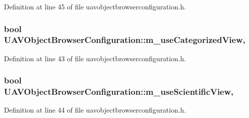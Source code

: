 Definition at line 45 of file uavobjectbrowserconfiguration.\-h.

\hypertarget{group___u_a_v_object_browser_plugin_ga5e0ce819c5383cf9b01ec73c887f67f8}{
\subsubsection[{m\-\_\-use\-Categorized\-View}]{\setlength{\rightskip}{0pt plus 5cm}bool U\-A\-V\-Object\-Browser\-Configuration\-::m\-\_\-use\-Categorized\-View\hspace{0.3cm}{\ttfamily [read]}, {\ttfamily [write]}}}\label{group___u_a_v_object_browser_plugin_ga5e0ce819c5383cf9b01ec73c887f67f8}


Definition at line 43 of file uavobjectbrowserconfiguration.\-h.

\hypertarget{group___u_a_v_object_browser_plugin_ga45e17799029628f880291ec2324473a5}{
\subsubsection[{m\-\_\-use\-Scientific\-View}]{\setlength{\rightskip}{0pt plus 5cm}bool U\-A\-V\-Object\-Browser\-Configuration\-::m\-\_\-use\-Scientific\-View\hspace{0.3cm}{\ttfamily [read]}, {\ttfamily [write]}}}\label{group___u_a_v_object_browser_plugin_ga45e17799029628f880291ec2324473a5}


Definition at line 44 of file uavobjectbrowserconfiguration.\-h.

